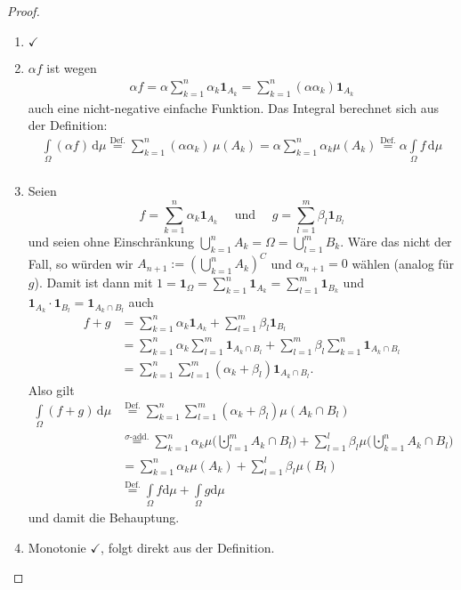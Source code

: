 \begin{proof}\abs
	\begin{enumerate}[label=(\roman*)]
		\item $\checkmark$
		\item $\alpha f$ ist wegen 
		\begin{align*}
			\alpha f = \alpha \sum\limits_{k = 1}^{n} \alpha_k \mathbf{1}_{A_k} = \sum\limits_{k = 1}^{n} (\alpha \alpha_k) \mathbf{1}_{A_k}
		\end{align*}	
		auch eine nicht-negative einfache Funktion. Das Integral berechnet sich aus der Definition:
		\begin{align*}
			 \int\limits_{\Omega} (\alpha f) \, \mathrm{d}\mu \overset{\text{Def.}}{=} \sum\limits_{k = 1}^{n} (\alpha \alpha_k)\, \mu(A_k) = \alpha \sum\limits_{k = 1}^{n} \alpha_k \mu(A_k)  \overset{\text{Def.}}{=}  \alpha \int\limits_{\Omega} f\, \mathrm{d}\mu\\
		\end{align*}
		\item Seien \[ f = \sum\limits_{k = 1}^{n} \alpha_k \mathbf{1}_{A_k}\quad \text{ und } \quad g = \sum\limits_{l = 1}^{m} \beta_l \mathbf{1}_{B_l} \]
		und seien ohne Einschr\"ankung $\bigcup\limits_{k = 1}^{n} A_k = \Omega = \bigcup\limits_{l = 1}^{m} B_k.$
		W\"are das nicht der Fall, so w\"urden wir $A_{n+1}:=(\bigcup_{k=1}^n A_k)^C$ und $\alpha_{n+1}=0$ w\"ahlen (analog f\"ur $g$). Damit ist dann mit $1=\mathbf{1}_\Omega= \sum_{k=1}^n \mathbf{1}_{A_k}=\sum_{l=1}^m \mathbf{1}_{B_k}$ und
		$\mathbf{1}_{A_k} \cdot \mathbf 1_{B_l}=\mathbf 1_{A_k\cap B_l}$ auch
		\begin{align*}
			f + g&= \sum\limits_{k = 1}^{n} \alpha_k \mathbf{1}_{A_k} + \sum\limits_{l = 1}^{m} \beta_l \mathbf{1}_{B_l}\\ 
			&= \sum\limits_{k = 1}^{n} \alpha_k \sum\limits_{l = 1}^{m} \mathbf{1}_{A_k \cap B_l} + \sum\limits_{l = 1}^{m} \beta_l \sum\limits_{k = 1}^{n} \mathbf{1}_{A_k \cap B_l} \\
			&= \sum\limits_{k = 1}^{n} \sum\limits_{l = 1}^{m} (\alpha_k + \beta_l) \mathbf{1}_{A_k \cap B_l}.
		\end{align*}
		Also gilt
		\begin{align*}
			\int\limits_{\Omega} (f + g)\, \mathrm{d}\mu &\overset{\text{Def.}}{=} \sum\limits_{k = 1}^{n} \sum\limits_{l = 1}^{m} (\alpha_k + \beta_l) \mu(A_k \cap B_l)\\ &\overset{\sigma\text{-add.}}{=}	\sum\limits_{k = 1}^{n} \alpha_k \mu\Big(\bigcupdot\limits_{l=1}^{m} A_k \cap B_l \Big) + \sum\limits_{l = 1}^{l} \beta_l \mu\Big(\bigcupdot\limits_{k=1}^{n} A_k \cap B_l \Big)\\
			&= \sum\limits_{k = 1}^{n} \alpha_k \mu(A_k) + \sum\limits_{l = 1}^{l} \beta_l \mu(B_l)\\
			& \overset{\text{Def.}}{=} \int\limits_{\Omega} f \mathrm{d}\mu + \int\limits_{\Omega} g \mathrm{d}\mu
		\end{align*}
		und damit die Behauptung.
		\item Monotonie $\checkmark$, folgt direkt aus der Definition.
	\end{enumerate}
\end{proof}

